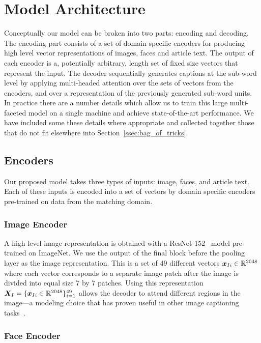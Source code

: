 
\section{Model Architecture}

Conceptually our model can be broken into two parts: encoding and decoding. The
encoding part consists of a set of domain specific encoders for producing high
level vector representations of images, faces and article text. The output of
each encoder is a, potentially arbitrary, length set of fixed size vectors that
represent the input. The decoder sequentially generates captions at the
sub-word level by applying
multi-headed attention over the sets of vectors from the encoders, and over a
representation of the previously generated sub-word units. In
practice there are a number details which allow us to train this large
multi-faceted model on a single machine and achieve state-of-the-art
performance. We have included some these details where appropriate and
collected together those that do not fit elsewhere into
Section~\ref{ssec:bag_of_tricks}.

\subsection{Encoders}

Our proposed model takes three types of inputs: image, faces, and article text.
Each of these inputs is encoded into a set of vectors by domain specific
encoders pre-trained on data from the matching domain.

\subsubsection{Image Encoder}

A high level image representation is obtained with a
ResNet-152~\cite{He2016ResNet} model pre-trained on ImageNet. We use the output
of the final block before the pooling layer as the image representation. This
is a set of 49 different vectors $\bm{x}_{Ii} \in \mathbb{R}^{2048}$ where each
vector corresponds to a separate image patch after the image is divided into
equal size 7 by 7 patches. Using this representation $\bm{X}_I = \{\bm{x}_{Ii} \in
\mathbb{R}^{2048}\}_{i=1}^{49}$ allows the decoder to attend different regions
in the image---a modeling choice that has proven useful in other image
captioning tasks~\cite{Xu2015ShowAA}.

\subsubsection{Face Encoder}

